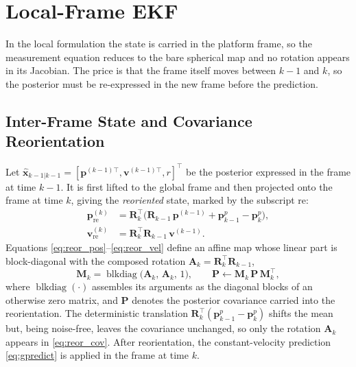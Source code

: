 \section{Local-Frame EKF}
\label{sec:local}

In the local formulation the state is carried in the platform frame, so the
measurement equation reduces to the bare spherical map and no rotation appears in
its Jacobian. The price is that the frame itself moves between $k-1$ and $k$, so
the posterior must be re-expressed in the new frame before the prediction.

\subsection{Inter-Frame State and Covariance Reorientation}

Let $\hat{\bm{x}}_{k-1|k-1}=[\bm{p}^{(k-1)\top},\bm{v}^{(k-1)\top},r]^{\top}$ be
the posterior expressed in the frame at time $k-1$. It is first lifted to the
global frame and then projected onto the frame at time $k$, giving the
\emph{reoriented} state, marked by the subscript $\mathrm{re}$:
\begin{align}
  \bm{p}^{(k)}_{\mathrm{re}} &= \bm{R}_k^{\top}\!\big(\bm{R}_{k-1}\,\bm{p}^{(k-1)} + \bm{p}^{p}_{k-1} - \bm{p}^{p}_k\big), \label{eq:reor_pos}\\
  \bm{v}^{(k)}_{\mathrm{re}} &= \bm{R}_k^{\top}\bm{R}_{k-1}\,\bm{v}^{(k-1)}. \label{eq:reor_vel}
\end{align}
Equations \eqref{eq:reor_pos}--\eqref{eq:reor_vel} define an affine map whose
linear part is block-diagonal with the composed rotation
$\bm{A}_k = \bm{R}_k^{\top}\bm{R}_{k-1}$,
\begin{equation}
  \bm{M}_k = \operatorname{blkdiag}\!\big(\bm{A}_k,\,\bm{A}_k,\,1\big),
  \qquad
  \bm{P} \leftarrow \bm{M}_k\,\bm{P}\,\bm{M}_k^{\top},
  \label{eq:reor_cov}
\end{equation}
where $\operatorname{blkdiag}(\cdot)$ assembles its arguments as the diagonal
blocks of an otherwise zero matrix, and $\bm{P}$ denotes the posterior covariance
carried into the reorientation.
The deterministic translation $\bm{R}_k^{\top}(\bm{p}^{p}_{k-1}-\bm{p}^{p}_k)$
shifts the mean but, being noise-free, leaves the covariance unchanged, so
only the rotation $\bm{A}_k$ appears in \eqref{eq:reor_cov}. After reorientation,
the constant-velocity prediction \eqref{eq:gpredict} is applied in the frame at
time $k$.

